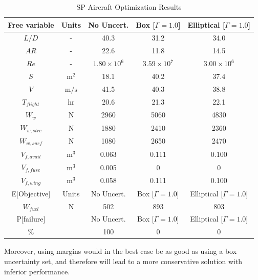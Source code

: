 \begin{table}[!h]
\begin{center}
\caption{\label{tab:results} SP Aircraft Optimization Results}
\begin{tabular}{c c c c c}
\hline
Free variable & Units & No Uncert. & Box [$\Gamma = 1.0$] & Elliptical [$\Gamma = 1.0$] \\
\hline
$L/D$ & - & 40.3 & 31.2 & 34.0 \\
$AR$ & - & 22.6 & 11.8 & 14.5 \\
$Re$ & - & $1.80 \times 10^6$ & $3.59 \times 10^7$ & $3.00 \times 10^6$ \\
$S$ & $\mathrm{m^2}$ & 18.1 & 40.2 & 37.4 \\
$V$ & $\mathrm{m/s}$ & 41.5 & 40.3 & 38.8 \\
$T_{flight}$ & $\mathrm{hr}$ & 20.6 & 21.3 & 22.1 \\
$W_w$ & $\mathrm{N}$ & 2960 & 5060 & 4830 \\
$W_{w,strc}$ & $\mathrm{N}$ & 1880 & 2410 & 2360 \\
$W_{w,surf}$ & $\mathrm{N}$ & 1080 & 2650 & 2470 \\
$V_{f,avail}$ & $\mathrm{m^3}$ & 0.063 & 0.111 & 0.100 \\
$V_{f,fuse}$ & $\mathrm{m^3}$ & 0.005 & 0 & 0 \\
$V_{f,wing}$ & $\mathrm{m^3}$ & 0.058 & 0.111 & 0.100 \\
\hline
E[Objective] & Units & No Uncert. & Box [$\Gamma = 1.0$] & Elliptical [$\Gamma = 1.0$] \\
\hline
$W_{fuel}$ & $\mathrm{N}$ & 502 & 893 & 803 \\
\hline
P[failure] & & No Uncert. & Box [$\Gamma = 1.0$] & Elliptical [$\Gamma = 1.0$] \\
\hline
\% & & 100 & 0 & 0\\
\hline
\end{tabular}
\end{center}
\end{table}


Moreover, using margins would in the best case be as good as using a box uncertainty set, and therefore will lead
to a more conservative solution with inferior performance.

